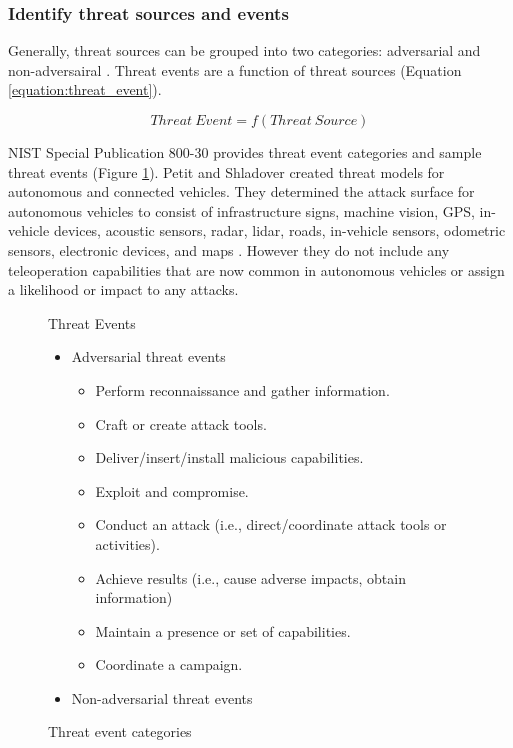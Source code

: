 \documentclass{article}
\begin{document}
\subsubsection{Identify threat sources and events}  \label{section:identify_threat_sources_and_events}

Generally, \gls{threat source}s can be grouped into two categories: adversarial and non-adversairal \citep{national_institute_of_standards_and_technology_nist_2012}. Threat events are a function of threat sources (Equation \ref{equation:threat_event}).

\begin{equation}
    Threat\ Event = f(Threat\ Source)
    \label{equation:threat_event}
\end{equation}

NIST Special Publication 800-30 provides threat event categories and sample threat events (Figure \ref{enumerate:national_institute_of_standards_and_technology_nist_2012-E}). Petit and Shladover created threat models for autonomous and connected vehicles. They determined the attack surface for autonomous vehicles to consist of infrastructure signs, machine vision, GPS, in-vehicle devices, acoustic sensors, radar, lidar, roads, in-vehicle sensors, odometric sensors, electronic devices, and maps \citep{petit_potential_2015}. However they do not include any teleoperation capabilities that are now common in autonomous vehicles or assign a likelihood or impact to any attacks.

\begin{figure}[h]
Threat Events
\begin{itemize}
  \item Adversarial threat events
    \begin{itemize}
        \item Perform reconnaissance and gather information.
        \item Craft or create attack tools.
        \item Deliver/insert/install malicious capabilities.
        \item Exploit and compromise.
        \item Conduct an attack (i.e., direct/coordinate attack tools or activities).
        \item Achieve results (i.e., cause adverse impacts, obtain information)
        \item Maintain a presence or set of capabilities.
        \item Coordinate a campaign.
    \end{itemize}
  \item Non-adversarial threat events
    \end{itemize}
\caption{Threat event categories \citep[Appendix E]{national_institute_of_standards_and_technology_nist_2012}}
    \label{enumerate:national_institute_of_standards_and_technology_nist_2012-E}
\end{figure}
\end{document}
